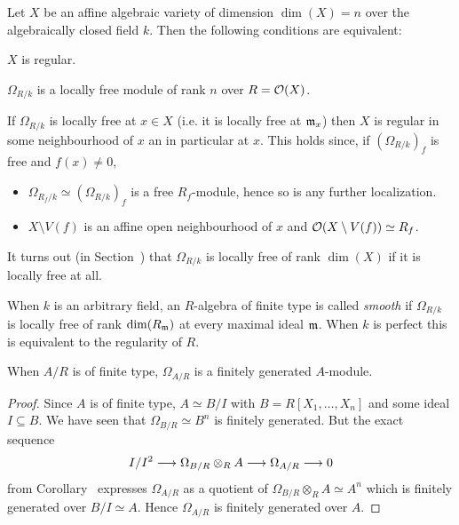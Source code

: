 \documentclass[a4paper,parskip=half,numbers=enddot, DIV=12]{scrreprt}
\begin{document}
\begin{prop}
    Let $X$ be an affine algebraic variety of dimension $\dim (X)=n$ over the algebraically closed field $k$. Then the following conditions are equivalent:
    \begin{alphanumerate}
        \item 
            $X$ is regular.
        \item 
            $\Omega_{R/k}$ is a locally free module of rank $n$ over $R= \mathcal{O}(X)$.
    \end{alphanumerate}
\end{prop}
\begin{rem*}
    \begin{alphanumerate}
      \item 
        If $\Omega_{R/k}$ is locally free at $x\in X$ (i.e. it is locally free at $\mathfrak{m}_x$) then $X$ is regular in some neighbourhood of $x$ an in particular at $x$. This holds since, if $(\Omega_{R/k})_f$ is free and $f(x)\neq 0$,
        \begin{itemize}
          \item    
            $\Omega_{R_f/k}\simeq(\Omega_{R/k})_f $ is a free $R_f$-module, hence so is any further localization.
          \item 
            $X\setminus V(f)$ is an affine open neighbourhood of $x$ and $\mathcal{O}(X\setminus V(f))\simeq R_f$.
        \end{itemize}
      \item 
        It turns out (in Section~) that $\Omega_{R/k}$ is locally free of rank $\dim(X)$ if it is locally free at all. 
      \item 
        When $k$ is an arbitrary field, an $R$-algebra of finite type is called \emph{smooth} if $\Omega_{R/k}$ is locally free of rank $\dim(R_{\mathfrak{m}})$ at every maximal ideal $\mathfrak{m}$. When $k$ is perfect this is equivalent to the regularity of $R$.
    \end{alphanumerate}
\end{rem*}
\begin{lem}
    When $A/R$ is of finite type, $\Omega_{A/R}$ is a finitely generated $A$-module.
\end{lem}
\begin{proof}
    Since $A$ is of finite type, $A\simeq B/I$ with $B=R[X_1,\ldots,X_n]$ and some ideal $I\subseteq B$. We have seen that $\Omega_{B/R} \simeq B^n$ is finitely generated. But the exact sequence
    \begin{align*}
        I/I^2 \morphism \Omega_{B/R}\otimes_R A \morphism \Omega_{A/R} \morphism 0
    \end{align*}
    from Corollary~ expresses $\Omega_{A/R}$ as a quotient of $\Omega_{B/R}\otimes_R A\simeq A^n$ which is finitely generated over $B/I\simeq A$. Hence $\Omega_{A/R}$ is finitely generated over $A$.
\end{proof}
\end{document}
